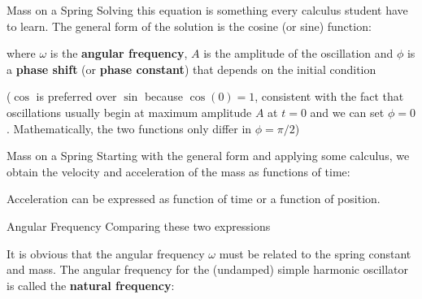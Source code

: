 \documentclass[12pt,compress,aspectratio=169]{beamer}
\newcommand{\eq}[2]{\vspace{#1}{\Large\begin{displaymath}#2\end{displaymath}}}
\begin{document}
\begin{frame}{Mass on a Spring}
  Solving this equation is something  every calculus student have to learn. The
  general form of the solution is the cosine (or sine) function:

  \eq{-.25in}{
    x(t)=A\cos(\omega t-\phi)
  }

  \vspace{-.1in}where $\omega$ is the \textbf{angular frequency}, $A$ is the
  amplitude of the oscillation and $\phi$ is a \textbf{phase shift} (or
  \textbf{phase constant}) that depends on the initial condition
  
  \vspace{.25in}\footnotesize{
    ($\cos$ is preferred over $\sin$ because $\cos(0)=1$, consistent with the
    fact that oscillations usually begin at maximum amplitude $A$ at $t=0$ and
    we can set $\phi=0$. Mathematically, the two functions only differ in
    $\phi=\pi/2$)
  }
\end{frame}


\begin{frame}{Mass on a Spring}
  Starting with the general form and applying some calculus, we obtain the
  velocity and acceleration of the mass as functions of time:
 
  \vspace{-.35in}{\Large
    \begin{align*}
      x(t)&=A\cos(\omega t-\phi)\\
      v(t)&=-A\omega\sin(\omega t-\phi)\\
      a(t)&=-A\omega^2\cos(\omega t-\phi)=-\omega^2x
    \end{align*}
  }

  Acceleration can be expressed as function of time or a function of position.
\end{frame}



\begin{frame}{Angular Frequency}
  Comparing these two expressions

  \eq{-.2in}{
    a(t)=-\omega^2x(t)\quad\quad -kx(t)=ma(t)
  }
  
  It is obvious that the angular frequency $\omega$ must be related to the
  spring constant and mass. The angular frequency for the (undamped) simple
  harmonic oscillator is called the \textbf{natural frequency}:

  \eq{-.15in}{
    \boxed{\omega=\sqrt{\frac{k}{m}}}
  }
\end{frame}
\end{document}
